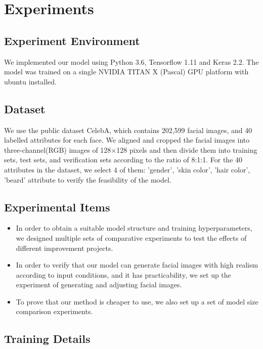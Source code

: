 \section{Experiments}

\subsection{Experiment Environment}
We implemented our model using Python 3.6, Tensorflow 1.11 and Keras 2.2.
The model was trained on a single NVIDIA TITAN X (Pascal) GPU platform with ubuntu installed.


\subsection{Dataset}
We use the public dataset CelebA, which contains 202,599 facial images, and 40 labelled attributes for each face.
We aligned and cropped the facial images into three-channel(RGB) images of 128×128 pixels and then divide them into training sets, test sets, and verification sets according to the ratio of 8:1:1.
For the 40 attributes in the dataset, we select 4 of them: 'gender', 'skin color', 'hair color', 'beard' attribute to verify the feasibility of the model.

\subsection{Experimental Items}
\begin{itemize}
\item In order to obtain a suitable model structure and training hyperparameters, we designed multiple sets of comparative experiments to test the effects of different improvement projects.
\item In order to verify that our model can generate facial images with high realism according to input conditions, and it has practicability, we set up the experiment of generating and adjusting facial images.
\item To prove that our method is cheaper to use, we also set up a set of model size comparison experiments.
\end{itemize}

\subsection{Training Details}

